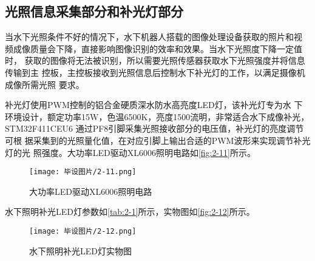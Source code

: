 \subsection{光照信息采集部分和补光灯部分}

当水下光照条件不好的情况下，水下机器人搭载的图像处理设备获取的照片和视
频成像质量会下降，直接影响图像识别的效率和效果。当水下光照度下降一定值时，
获取的图像将无法被识别，所以需要光照传感器获取水下光照强度并将信息传输到主
控板，主控板接收到光照信息后控制水下补光灯的工作，以满足摄像机成像所需光照
要求。
\begin{table}[H]
    \fangsong
    \caption{\label{tab:2-1}水下照明补光LED灯参数}
    \small %
    \centering%
    \renewcommand{\arraystretch}{1.5}
\end{table}

补光灯使用PWM控制的铝合金硬质深水防水高亮度LED灯，该补光灯专为水
下环境设计，额定功率15W，色温6500K，亮度1500流明，非常适合水下成像补光，
STM32F411CEU6 通过PF8引脚采集光照接收部分的电压值，补光灯的亮度调节可根
据采集到的光照量化值，在对应引脚上输出合适的PWM波形来实现调节补光灯的光
照强度。大功率LED驱动XL6006照明电路如\autoref{fig:2-11}所示。
\begin{figure}[htbp]
    \centering
    \texttt{[image: 毕设图片/2-11.png]}
    \caption{\label{fig:2-11}大功率LED驱动XL6006照明电路}
\end{figure}
水下照明补光LED灯参数如\autoref{tab:2-1}所示，实物图如\autoref{fig:2-12}所示。

\begin{figure}[htbp]
    \centering
    \texttt{[image: 毕设图片/2-12.png]}
    \caption{\label{fig:2-12}水下照明补光LED灯实物图}
\end{figure}
